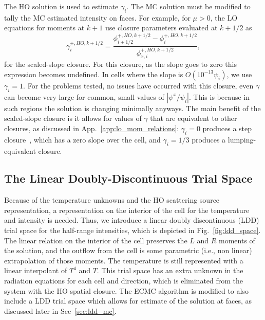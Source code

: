 The HO solution is used to estimate $\gamma_i$. The MC solution must be modified
to tally the MC estimated intensity on faces. For example, for $\mu>0$, the LO equations for
moments at $k+1$ use closure parameters evaluated at $k+1/2$ as
\begin{equation}
    \gamma_i^{+,HO,k+1/2} = \frac{\phi_{i+1/2}^{+,HO,k+1/2} -
    \phi_{i}^{+,HO,k+1/2}}{\phi_{x,i}^{+,HO,k+1/2}},
\end{equation}
for the scaled-slope closure.  For this closure, as the slope goes to zero this expression
becomes undefined.  In cells where the slope is $O(10^{-13} \psi_i)$, we use $\gamma_i=1$.
For the problems tested, no issues have occurred with this closure, even $\gamma$
can become very large for common, small values of $|\psi^x/\psi_i|$.  This is because in
such regions the solution is changing minimally anyways. 
The main benefit of the scaled-slope closure is it allows for values of $\gamma$ that are
equivalent to other closures, as discussed in App.~\ref{app:lo_mom_relations}:
$\gamma_i=0$ produces a step closure~\cite{larsen_edl}, which has a zero slope over the cell, and $\gamma_i=1/3$
produces a lumping-equivalent closure. 

\subsection{The Linear Doubly-Discontinuous Trial Space}
\label{sec:ldd}

Because of the temperature unknowns and the HO scattering source representation, a
representation on the interior of the cell for the temperature and intensity is needed.
Thus, we introduce a linear doubly discontinuous (LDD) trial space
for the half-range intensities, which is depicted in Fig.~\ref{fig:ldd_space}.  The linear
relation on the interior of the cell preserves the $L$ and $R$ moments of the solution,
and the outflow from the cell is some parametric (i.e., non linear) extrapolation of
those moments. 
The temperature is still represented with a linear interpolant of $T^4$ and $T$.  This
trial space has an extra unknown in the radiation equations for each cell and direction, which is eliminated
from the system with the HO spatial closure.  The ECMC algorithm is modified to also
include a LDD trial space which allows for estimate of the solution at faces, as discussed
later in Sec~\ref{sec:ldd_mc}. 

